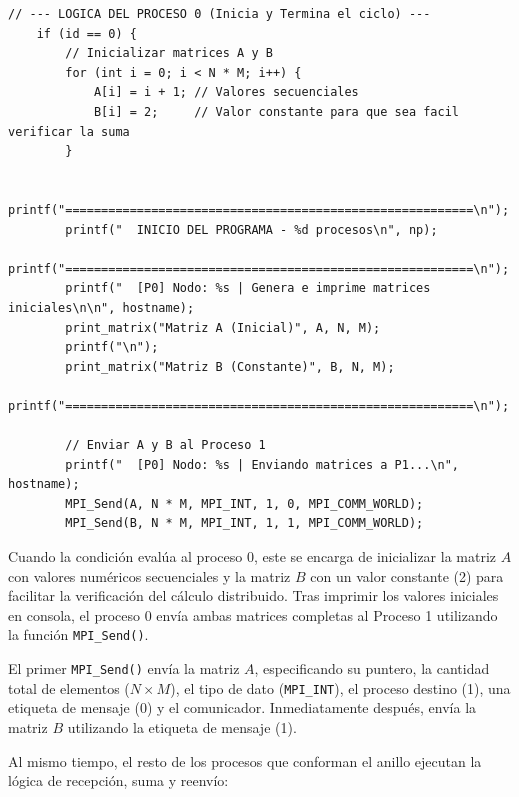 \documentclass[letterpaper,11pt]{article}
\begin{document}
    \begin{lstlisting}[style=cstyle,caption={Generacion de matrices e inicio del anillo en proceso 0},label={lst:programa-a}]
    // --- LOGICA DEL PROCESO 0 (Inicia y Termina el ciclo) ---
    if (id == 0) {
        // Inicializar matrices A y B
        for (int i = 0; i < N * M; i++) {
            A[i] = i + 1; // Valores secuenciales
            B[i] = 2;     // Valor constante para que sea facil verificar la suma
        }

        printf("=========================================================\n");
        printf("  INICIO DEL PROGRAMA - %d procesos\n", np);
        printf("=========================================================\n");
        printf("  [P0] Nodo: %s | Genera e imprime matrices iniciales\n\n", hostname);
        print_matrix("Matriz A (Inicial)", A, N, M);
        printf("\n");
        print_matrix("Matriz B (Constante)", B, N, M);
        printf("=========================================================\n");

        // Enviar A y B al Proceso 1
        printf("  [P0] Nodo: %s | Enviando matrices a P1...\n", hostname);
        MPI_Send(A, N * M, MPI_INT, 1, 0, MPI_COMM_WORLD);
        MPI_Send(B, N * M, MPI_INT, 1, 1, MPI_COMM_WORLD);
    \end{lstlisting}

    Cuando la condición evalúa al proceso 0, este se encarga de inicializar la matriz $A$ con valores numéricos secuenciales y la matriz $B$ con un valor constante (2) para facilitar la verificación del cálculo distribuido. Tras imprimir los valores iniciales en consola, el proceso 0 envía ambas matrices completas al Proceso 1 utilizando la función \texttt{MPI\_Send()}. 
    
    El primer \texttt{MPI\_Send()} envía la matriz $A$, especificando su puntero, la cantidad total de elementos ($N \times M$), el tipo de dato (\texttt{MPI\_INT}), el proceso destino (1), una etiqueta de mensaje (0) y el comunicador. Inmediatamente después, envía la matriz $B$ utilizando la etiqueta de mensaje (1).

    Al mismo tiempo, el resto de los procesos que conforman el anillo ejecutan la lógica de recepción, suma y reenvío:
\end{document}
